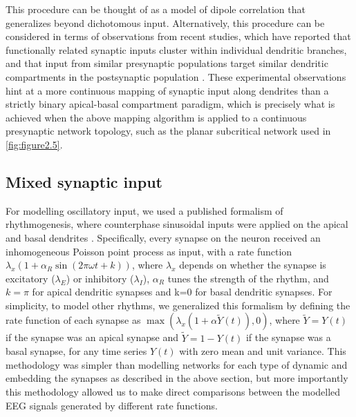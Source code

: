 This procedure can be thought of as a model of dipole correlation that generalizes beyond dichotomous input. Alternatively, this procedure can be considered in terms of observations from recent studies, which have reported that functionally related synaptic inputs cluster within individual dendritic branches, and that input from similar presynaptic populations target similar dendritic compartments in the postsynaptic population \cite{Iacaruso2017, Ju2020, Kerlin2019, Lafourcade2022, Scholl2017}. These experimental observations hint at a more continuous mapping of synaptic input along dendrites than a strictly binary apical-basal compartment paradigm, which is precisely what is achieved when the above mapping algorithm is applied to a continuous presynaptic network topology, such as the planar subcritical network used in \autoref{fig:figure2.5}.

\subsection{Mixed synaptic input}
For modelling oscillatory input, we used a published formalism of rhythmogenesis, where counterphase sinusoidal inputs were applied on the apical and basal dendrites \cite{Jones2009, Studenova2022}. Specifically, every synapse on the neuron received an inhomogeneous Poisson point process as input, with a rate function $\lambda_x\left(1+\alpha_R\sin{\left(2\pi\omega t+k\right)}\right)$, where $\lambda_x$ depends on whether the synapse is excitatory ($\lambda_E$) or inhibitory ($\lambda_I$), $\alpha_R$ tunes the strength of the rhythm, and $k=\pi$ for apical dendritic synapses and k=0 for basal dendritic synapses. For simplicity, to model other rhythms, we generalized this formalism by defining the rate function of each synapse as $\max{\left(\lambda_x\left(1+\alpha\widetilde{Y}{\left(t\right)}\right),0\right)}$, where $\widetilde{Y}=Y(t)$ if the synapse was an apical synapse and $\widetilde{Y}=1-Y(t)$ if the synapse was a basal synapse, for any time series $Y(t)$ with zero mean and unit variance. This methodology was simpler than modelling networks for each type of dynamic and embedding the synapses as described in the above section, but more importantly this methodology allowed us to make direct comparisons between the modelled EEG signals generated by different rate functions.

